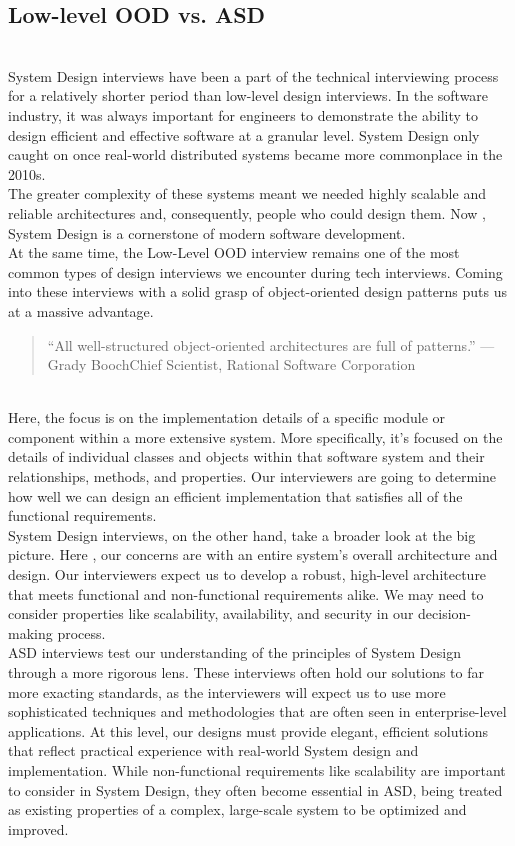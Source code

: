 \subsection{Low-level OOD vs. ASD}\label{ruOrzpRz6MZ3hFfS8guQj}
\\
System Design interviews have been a part of the technical interviewing process for a relatively shorter period than low-level design interviews. In the software industry, it was always important for engineers to demonstrate the ability to design efficient and effective software at a granular level. System Design only caught on once real-world distributed systems became more commonplace in the 2010s.
\\
The greater complexity of these systems meant we needed highly scalable and reliable architectures and, consequently, people who could design them. Now , System Design is a cornerstone of modern software development.
\\
At the same time, the Low-Level OOD interview remains one of the most common types of design interviews we encounter during tech interviews. Coming into these interviews with a solid grasp of object-oriented design patterns puts us at a massive advantage.
\begin{quote}
``All well-structured object-oriented architectures are full of patterns.'' --- Grady BoochChief Scientist, Rational Software Corporation
\end{quote}
\\
Here, the focus is on the implementation details of a specific module or component within a more extensive system. More specifically, it's focused on the details of individual classes and objects within that software system and their relationships, methods, and properties. Our interviewers are going to determine how well we can design an efficient implementation that satisfies all of the functional requirements.
\\
System Design interviews, on the other hand, take a broader look at the big picture. Here , our concerns are with an entire system's overall architecture and design. Our interviewers expect us to develop a robust, high-level architecture that meets functional and non-functional requirements alike. We may need to consider properties like scalability, availability, and security in our decision-making process.
\\
ASD interviews test our understanding of the principles of System Design through a more rigorous lens. These interviews often hold our solutions to far more exacting standards, as the interviewers will expect us to use more sophisticated techniques and methodologies that are often seen in enterprise-level applications. At this level, our designs must provide elegant, efficient solutions that reflect practical experience with real-world System design and implementation. While non-functional requirements like scalability are important to consider in System Design, they often become essential in ASD, being treated as existing properties of a complex, large-scale system to be optimized and improved.
